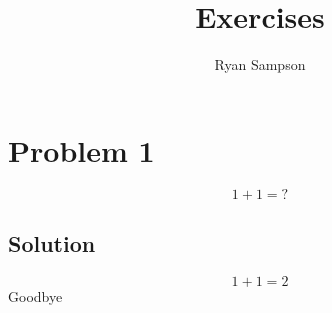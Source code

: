 \documentclass{article}
\title{Exercises}
\author{Ryan Sampson}
\newcommand{\problem}[1]{\section*{Problem #1}}
\newcommand{\solution}{\subsection*{Solution}}
\begin{document}
\maketitle
\problem{1}
\[ 1 + 1 = ? \]
\solution
\[ 1 + 1 = 2 \]
\newpage
Goodbye
\end{document}
